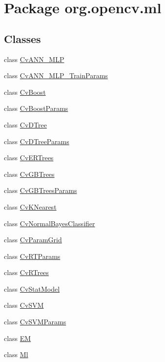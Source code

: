 \hypertarget{namespaceorg_1_1opencv_1_1ml}{}\section{Package org.\+opencv.\+ml}
\label{namespaceorg_1_1opencv_1_1ml}
\subsection*{Classes}
\begin{DoxyCompactItemize}
\item 
class \mbox{\hyperlink{classorg_1_1opencv_1_1ml_1_1_cv_a_n_n___m_l_p}{Cv\+A\+N\+N\+\_\+\+M\+LP}}
\item 
class \mbox{\hyperlink{classorg_1_1opencv_1_1ml_1_1_cv_a_n_n___m_l_p___train_params}{Cv\+A\+N\+N\+\_\+\+M\+L\+P\+\_\+\+Train\+Params}}
\item 
class \mbox{\hyperlink{classorg_1_1opencv_1_1ml_1_1_cv_boost}{Cv\+Boost}}
\item 
class \mbox{\hyperlink{classorg_1_1opencv_1_1ml_1_1_cv_boost_params}{Cv\+Boost\+Params}}
\item 
class \mbox{\hyperlink{classorg_1_1opencv_1_1ml_1_1_cv_d_tree}{Cv\+D\+Tree}}
\item 
class \mbox{\hyperlink{classorg_1_1opencv_1_1ml_1_1_cv_d_tree_params}{Cv\+D\+Tree\+Params}}
\item 
class \mbox{\hyperlink{classorg_1_1opencv_1_1ml_1_1_cv_e_r_trees}{Cv\+E\+R\+Trees}}
\item 
class \mbox{\hyperlink{classorg_1_1opencv_1_1ml_1_1_cv_g_b_trees}{Cv\+G\+B\+Trees}}
\item 
class \mbox{\hyperlink{classorg_1_1opencv_1_1ml_1_1_cv_g_b_trees_params}{Cv\+G\+B\+Trees\+Params}}
\item 
class \mbox{\hyperlink{classorg_1_1opencv_1_1ml_1_1_cv_k_nearest}{Cv\+K\+Nearest}}
\item 
class \mbox{\hyperlink{classorg_1_1opencv_1_1ml_1_1_cv_normal_bayes_classifier}{Cv\+Normal\+Bayes\+Classifier}}
\item 
class \mbox{\hyperlink{classorg_1_1opencv_1_1ml_1_1_cv_param_grid}{Cv\+Param\+Grid}}
\item 
class \mbox{\hyperlink{classorg_1_1opencv_1_1ml_1_1_cv_r_t_params}{Cv\+R\+T\+Params}}
\item 
class \mbox{\hyperlink{classorg_1_1opencv_1_1ml_1_1_cv_r_trees}{Cv\+R\+Trees}}
\item 
class \mbox{\hyperlink{classorg_1_1opencv_1_1ml_1_1_cv_stat_model}{Cv\+Stat\+Model}}
\item 
class \mbox{\hyperlink{classorg_1_1opencv_1_1ml_1_1_cv_s_v_m}{Cv\+S\+VM}}
\item 
class \mbox{\hyperlink{classorg_1_1opencv_1_1ml_1_1_cv_s_v_m_params}{Cv\+S\+V\+M\+Params}}
\item 
class \mbox{\hyperlink{classorg_1_1opencv_1_1ml_1_1_e_m}{EM}}
\item 
class \mbox{\hyperlink{classorg_1_1opencv_1_1ml_1_1_ml}{Ml}}
\end{DoxyCompactItemize}
